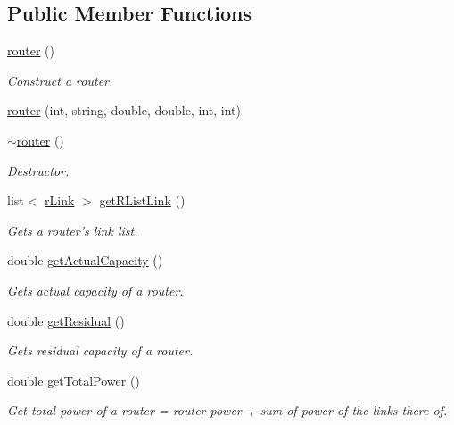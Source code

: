 \subsection*{Public Member Functions}
\begin{DoxyCompactItemize}
\item 
\hyperlink{classrouter_af5559739f6e4f9b1c7f7bf80e32f6cd9}{router} ()
\begin{DoxyCompactList}\small\item\em Construct a router. \item\end{DoxyCompactList}\item 
\hyperlink{classrouter_a43d7888550284a3bffff71abf6c087eb}{router} (int, string, double, double, int, int)
\item 
\hyperlink{classrouter_a64870f29b48d6ee6276ec27b1b18e189}{$\sim$router} ()
\begin{DoxyCompactList}\small\item\em Destructor. \item\end{DoxyCompactList}\item 
list$<$ \hyperlink{classrLink}{rLink} $>$ \hyperlink{classrouter_a36115bd5923217c64922b2231f05c304}{getRListLink} ()
\begin{DoxyCompactList}\small\item\em Gets a router's link list. \item\end{DoxyCompactList}\item 
double \hyperlink{classrouter_a0c1d4a7689e992d90b0fcbf4a958c8b4}{getActualCapacity} ()
\begin{DoxyCompactList}\small\item\em Gets actual capacity of a router. \item\end{DoxyCompactList}\item 
double \hyperlink{classrouter_a7d5187977fd2dbf2fa562d3953647699}{getResidual} ()
\begin{DoxyCompactList}\small\item\em Gets residual capacity of a router. \item\end{DoxyCompactList}\item 
double \hyperlink{classrouter_a425b6d8372b0951a77097d0e6b49914a}{getTotalPower} ()
\begin{DoxyCompactList}\small\item\em Get total power of a router = router power + sum of power of the links there of. \item\end{DoxyCompactList}\item 

\end{DoxyCompactItemize}
